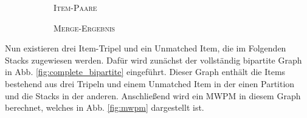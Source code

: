 \begin{figure}[H]
\centering
\begin{subfigure}[b]{0.4\textwidth}
\centering
{}
\caption{\textsc{Item-Paare}}
\label{fig:item_pairs}
\end{subfigure}
\hspace{10pt}
\begin{subfigure}[b]{0.4\textwidth}
\centering
{}
\caption{\textsc{Merge-Ergebnis}}
\label{fig:merge_result}
\end{subfigure}
\caption{}
\label{fig:merge_step}
\end{figure}

Nun existieren drei Item-Tripel und ein Unmatched Item, die im Folgenden Stacks zugewiesen werden.
Dafür wird zunächst der vollständig bipartite Graph in Abb. \ref{fig:complete_bipartite} eingeführt.
Dieser Graph enthält die Items bestehend aus drei Tripeln und einem Unmatched Item in der einen Partition
und die Stacks in der anderen. Anschließend wird ein \textsc{MWPM} in diesem Graph berechnet, welches
in Abb. \ref{fig:mwpm} dargestellt ist.


